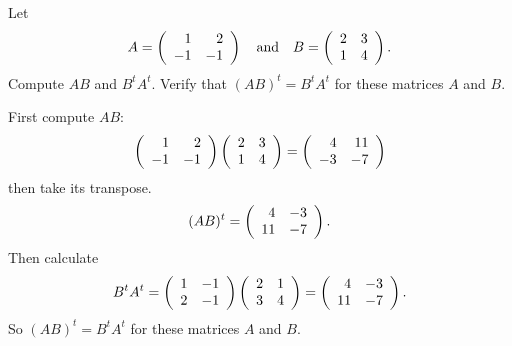 \documentclass{ximera}
\begin{document}
\begin{exercise} \label{c4.7.3}
Let
\[
A=\mattwo{1}{2}{-1}{-1} \AND B =\mattwo{2}{3}{1}{4}.
\]
Compute $AB$ and $B^tA^t$.  Verify that $(AB)^t=B^tA^t$ for these
matrices $A$ and $B$.

\begin{solution}
First compute $AB$:
\[ \mattwo{1}{2}{-1}{-1}\mattwo{2}{3}{1}{4} =
\mattwo{4}{11}{-3}{-7} \]
then take its transpose.
\[ (AB)^t = \mattwo{4}{-3}{11}{-7}. \]
Then calculate
\[ B^tA^t = \mattwo{1}{-1}{2}{-1}\mattwo{2}{1}{3}{4} =
\mattwo{4}{-3}{11}{-7}. \]
So $(AB)^t = B^tA^t$ for these matrices $A$ and $B$.

\end{solution}
\end{exercise}
\end{document}
